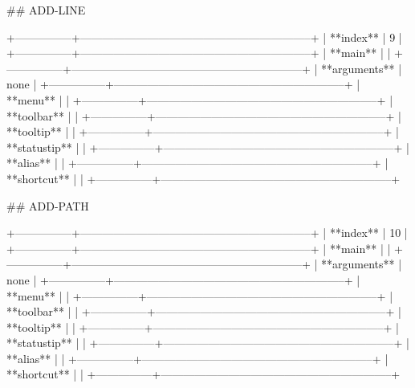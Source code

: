 ## ADD-LINE

+---------------+--------------------------------------------------------------+
| **index**     | 9                                                            |
+---------------+--------------------------------------------------------------+
| **main**      |                                                              |
+---------------+--------------------------------------------------------------+
| **arguments** | none                                                         |
+---------------+--------------------------------------------------------------+
| **menu**      |                                                              |
+---------------+--------------------------------------------------------------+
| **toolbar**   |                                                              |
+---------------+--------------------------------------------------------------+
| **tooltip**   |                                                              |
+---------------+--------------------------------------------------------------+
| **statustip** |                                                              |
+---------------+--------------------------------------------------------------+
| **alias**     |                                                              |
+---------------+--------------------------------------------------------------+
| **shortcut**  |                                                              |
+---------------+--------------------------------------------------------------+

## ADD-PATH

+---------------+--------------------------------------------------------------+
| **index**     | 10                                                           |
+---------------+--------------------------------------------------------------+
| **main**      |                                                              |
+---------------+--------------------------------------------------------------+
| **arguments** | none                                                         |
+---------------+--------------------------------------------------------------+
| **menu**      |                                                              |
+---------------+--------------------------------------------------------------+
| **toolbar**   |                                                              |
+---------------+--------------------------------------------------------------+
| **tooltip**   |                                                              |
+---------------+--------------------------------------------------------------+
| **statustip** |                                                              |
+---------------+--------------------------------------------------------------+
| **alias**     |                                                              |
+---------------+--------------------------------------------------------------+
| **shortcut**  |                                                              |
+---------------+--------------------------------------------------------------+

